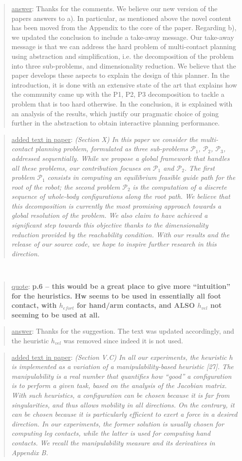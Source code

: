 \documentclass[a4paper]{article}
\newcommand{\gls}[1]{\textit{#1}}
\newcommand{\done}[0]{}
\newcommand\quot[1]{\begin{quote} \underline{quote}: \textbf{#1}\end{quote}}
\newcommand\as[1]{\begin{quote} \underline{answer}: {#1}\end{quote} }
\newcommand\qt[1]{\begin{quote} \underline{added text in paper}: \textit{#1}\end{quote} \leavevmode \\ }
\begin{document}
\as{Thanks for the comments. We believe our new version of the papers answers to a). In particular, as mentioned above the novel content has been moved from the Appendix
to the core of the paper. Regarding b), we updated the conclusion
to include a take-away message. Our take-away message is that we can address the hard problem of multi-contact planning using 
abstraction and simplification, i.e. the decomposition of the problem into three sub-problems, and  dimensionality reduction.
We believe that the paper develops these aspects to explain the design of this planner. In the introduction, it is done
with an extensive state of the art that explains how the community came up with the P1, P2, P3 decomposition to tackle a problem that is too hard otherwise. In the conclusion, it is explained 
with an analysis of the results, which justify our pragmatic choice of going further in the abstraction to obtain interactive planning performance. }
\qt{(Section X) In this paper we consider the multi-contact planning problem, formulated as three sub-problems  $\mathcal{P}_1$,  $\mathcal{P}_2$,  $\mathcal{P}_3$, addressed sequentially. While we propose a global framework that handles all these problems, our contribution focuses on  $\mathcal{P}_1$ and  $\mathcal{P}_2$.
The first problem $\mathcal{P}_1$ consists in computing an \gls{equilibrium feasible} guide path for the root of the robot;
the second problem $\mathcal{P}_2$ is the computation of a discrete sequence of whole-body configurations along the root path.
We believe that this decomposition is currently the most promising approach towards
a global resolution of the problem. We also claim to have achieved a significant step towards this objective thanks to the dimensionality reduction provided by
the reachability condition. With our results and the release of our source code, we hope to inspire further research in this direction.}\done

\quot{
p.6 – this would be a great place to give more ``intuition'' for the heuristics. Hw seems to be used in essentially all foot contact, with $h_{efort}$ for hand/arm contacts, and ALSO $h_{vel}$ not seeming to be used at all.}
\as{Thanks for the suggestion. The text was updated accordingly, and the heuristic $h_{vel}$ was removed since indeed it is not used.} 
\qt{(Section V.C) In all our experiments, the heuristic $h$ is implemented as a variation of a manipulability-based heuristic [27]. The manipulability is a real number that quantifies how 
``good'' a configuration is to perform a given task, based on the analysis of the Jacobian matrix. With such heuristics, a configuration can be chosen because it is far from singularities, and thus allows mobility in all directions. On the contrary, it can be chosen because it is particularly efficient to exert a force in a desired direction. In our experiments, the former solution is usually chosen for computing leg contacts, while the latter is used for computing hand contacts. We recall the manipulability measure and its derivatives in Appendix B.}\done
\end{document}

